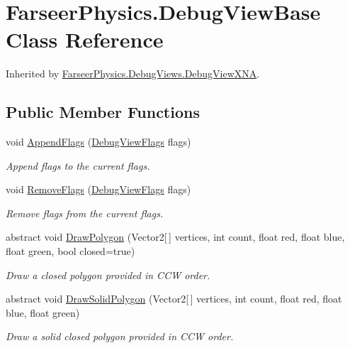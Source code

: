 \hypertarget{class_farseer_physics_1_1_debug_view_base}{\section{Farseer\+Physics.\+Debug\+View\+Base Class Reference}
\label{class_farseer_physics_1_1_debug_view_base}
}


Inherited by \hyperlink{class_farseer_physics_1_1_debug_views_1_1_debug_view_x_n_a}{Farseer\+Physics.\+Debug\+Views.\+Debug\+View\+X\+N\+A}.

\subsection*{Public Member Functions}
\begin{DoxyCompactItemize}
\item 
void \hyperlink{class_farseer_physics_1_1_debug_view_base_a97cd50c9a6447e8206f1f78526f4851b}{Append\+Flags} (\hyperlink{namespace_farseer_physics_a49e4405bbcaeebabbc6951e026b697e2}{Debug\+View\+Flags} flags)
\begin{DoxyCompactList}\small\item\em Append flags to the current flags. \end{DoxyCompactList}\item 
void \hyperlink{class_farseer_physics_1_1_debug_view_base_aabc4a89ed05e54d9b5ed14560f401e67}{Remove\+Flags} (\hyperlink{namespace_farseer_physics_a49e4405bbcaeebabbc6951e026b697e2}{Debug\+View\+Flags} flags)
\begin{DoxyCompactList}\small\item\em Remove flags from the current flags. \end{DoxyCompactList}\item 
abstract void \hyperlink{class_farseer_physics_1_1_debug_view_base_a1161f43cb54f76eba7c78f89adb474b5}{Draw\+Polygon} (Vector2\mbox{[}$\,$\mbox{]} vertices, int count, float red, float blue, float green, bool closed=true)
\begin{DoxyCompactList}\small\item\em Draw a closed polygon provided in C\+C\+W order. \end{DoxyCompactList}\item 
abstract void \hyperlink{class_farseer_physics_1_1_debug_view_base_ae193fb495686fa900f8ecea641ab9573}{Draw\+Solid\+Polygon} (Vector2\mbox{[}$\,$\mbox{]} vertices, int count, float red, float blue, float green)
\begin{DoxyCompactList}\small\item\em Draw a solid closed polygon provided in C\+C\+W order. \end{DoxyCompactList}\item 

\end{DoxyCompactItemize}
